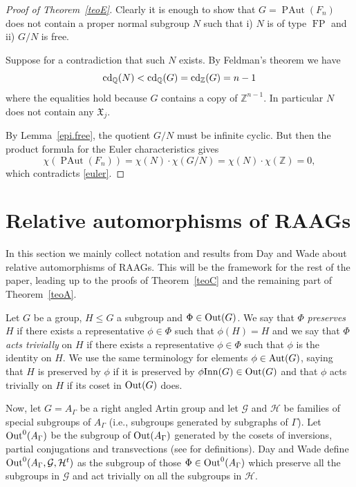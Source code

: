 \documentclass[10pt]{amsart}
\theoremstyle{definition}
\newcommand{\cd}{{\rm cd}}
\newcommand{\Out}{{\rm Out}}
\newcommand{\Inn}{{\rm Inn}}
\newcommand{\Aut}{{\rm Aut}}
\newcommand{\Q}{\mathbb Q}
\newcommand{\Z}{\mathbb Z}
\newcommand{\X}{\mathfrak{X}}
\newcommand{\FP}{\operatorname{FP}}
\newcommand{\PAut}{\operatorname{PAut}}
\theoremstyle{definition}
\numberwithin{equation}{section}
\begin{document}
\begin{proof}[Proof of Theorem~\ref{teoE}]
 Clearly it is enough to show that $G = \PAut(F_n)$ does not contain a proper normal subgroup $N$ such that i) $N$ is of type $\FP$ and ii) $G/N$ is free.

 Suppose for  a contradiction that such $N$ exists. By Feldman's theorem \cite[Thm.~5.5]{BieriBook} we have
 \[ \cd_\Q(N) <  \cd_\Q(G) = \cd_\Z(G) = n-1\]
 where the equalities hold because $G$ contains a copy of $\Z^{n-1}$. In particular $N$ does not contain any $\X_j$.


 By Lemma~\ref{epi.free}, the quotient $G/N$ must be infinite cyclic. But then the product formula for the Euler characteristics \cite[IX-7.3]{BrownBook} gives
 \[ \chi( \PAut(F_n) ) = \chi(N) \cdot \chi(G/N) = \chi(N) \cdot \chi(\Z) =0,\]
 which contradicts \eqref{euler}.
 \end{proof}

\section{Relative automorphisms of RAAGs} 
  In this section we mainly collect notation and results from Day and Wade \cite{DayWade} about relative automorphisms of RAAGs. This will be the framework for the rest of the paper, leading up to the proofs of Theorem~\ref{teoC} and the remaining part of Theorem~\ref{teoA}.
 
 Let $G$ be a group, $H\leq G$ a subgroup and $\Phi\in\Out(G)$. We say that $\Phi$ {\sl preserves} $H$ if there exists a representative $\phi\in\Phi$ such that $\phi(H)=H$ and we say that $\Phi$ {\sl acts trivially} on $H$ if there exists a representative $\phi\in\Phi$ such that $\phi$ is the identity on $H$. We use the same terminology for elements $\phi\in\Aut(G)$, saying that $H$ is preserved by $\phi$ if it is preserved by $\phi\Inn(G)\in\Out(G)$ and that $\phi$ acts trivially on $H$ if its coset in $\Out(G)$ does.


 Now, let $G=A_\Gamma$ be a right angled Artin group and let $\mathcal{G}$ and $\mathcal{H}$ be families of special subgroups of $A_\Gamma$ (i.e., subgroups generated by subgraphs of $\Gamma$). Let $\Out^0(A_\Gamma)$ be the subgroup of $\Out(A_\Gamma)$ generated by the cosets of inversions, partial conjugations and transvections  (see \cite{DayWade} for definitions). Day and Wade define $\Out^0(A_\Gamma,\mathcal{G},\mathcal{H}^t)$ as the subgroup of those $\Phi\in\Out^0(A_\Gamma)$ which preserve all the subgroups in $\mathcal{G}$ and act trivially on all the subgroups in $\mathcal{H}$.
 
\end{document}
